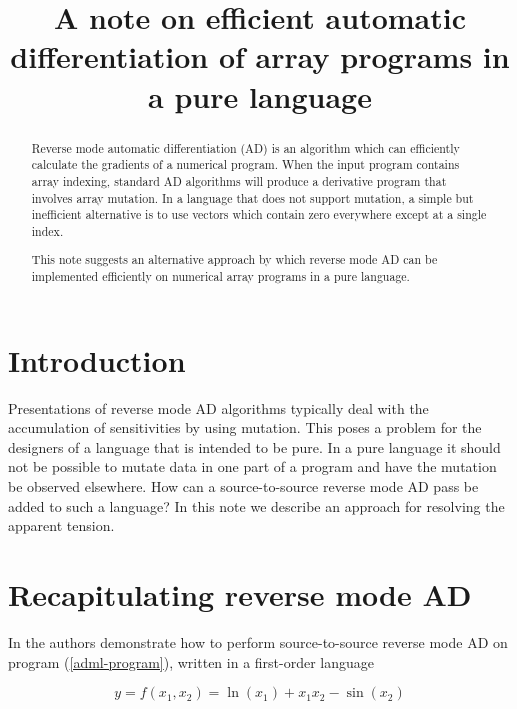 \documentclass[12pt]{article}
\title{A note on efficient automatic differentiation of array programs
  in a pure language}
\author{}
\begin{document}
\maketitle

\begin{abstract}
Reverse mode automatic differentiation (AD) is an algorithm which can
efficiently calculate the gradients of a numerical program.  When the
input program contains array indexing, standard AD algorithms will
produce a derivative program that involves array mutation.  In a
language that does not support mutation, a simple but inefficient
alternative is to use vectors which contain zero everywhere except at
a single index.

This note suggests an alternative approach by which reverse mode AD
can be implemented efficiently on numerical array programs in a pure
language.
\end{abstract}

\section{Introduction}

Presentations of reverse mode AD algorithms typically deal with the
accumulation of sensitivities by using mutation.  This poses a problem
for the designers of a language that is intended to be pure.  In a
pure language it should not be possible to mutate data in one part of
a program and have the mutation be observed elsewhere.  How can a
source-to-source reverse mode AD pass be added to such a language?  In
this note we describe an approach for resolving the apparent tension.

\section{Recapitulating reverse mode AD}

In \cite{adml} the authors demonstrate how to perform source-to-source
reverse mode AD on program (\ref{adml-program}), written in a
first-order language

\begin{equation}
\label {adml-program}
y = f(x_1, x_2) = \ln(x_1)+x_1 x_2-\sin(x_2)
\end{equation}
\end{document}
